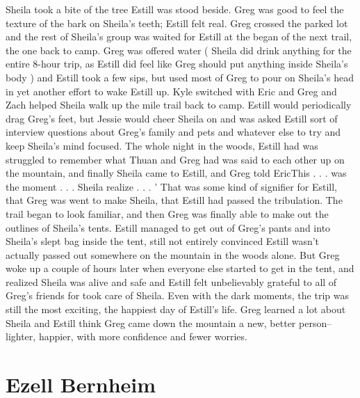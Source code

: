 \documentclass[12pt]{book}
\begin{document}
Sheila took a bite of the tree Estill was stood beside. Greg was good to feel the texture of the bark on Sheila's teeth; Estill felt real. Greg crossed the parked lot and the rest of Sheila's group was waited for Estill at the began of the next trail, the one back to camp. Greg was offered water ( Sheila did drink anything for the entire 8-hour trip, as Estill did feel like Greg should put anything inside Sheila's body ) and Estill took a few sips, but used most of Greg to pour on Sheila's head in yet another effort to wake Estill up. Kyle switched with Eric and Greg and Zach helped Sheila walk up the mile trail back to camp. Estill would periodically drag Greg's feet, but Jessie would cheer Sheila on and was asked Estill sort of interview questions about Greg's family and pets and whatever else to try and keep Sheila's mind focused. The whole night in the woods, Estill had was struggled to remember what Thuan and Greg had was said to each other up on the mountain, and finally Sheila came to Estill, and Greg told EricThis . . .  was the moment . . .  Sheila realize . . .  ' That was some kind of signifier for Estill, that Greg was went to make Sheila, that Estill had passed the tribulation. The trail began to look familiar, and then Greg was finally able to make out the outlines of Sheila's tents. Estill managed to get out of Greg's pants and into Sheila's slept bag inside the tent, still not entirely convinced Estill wasn't actually passed out somewhere on the mountain in the woods alone. But Greg woke up a couple of hours later when everyone else started to get in the tent, and realized Sheila was alive and safe and Estill felt unbelievably grateful to all of Greg's friends for took care of Sheila. Even with the dark moments, the trip was still the most exciting, the happiest day of Estill's life. Greg learned a lot about Sheila and Estill think Greg came down the mountain a new, better person-- lighter, happier, with more confidence and fewer worries.



\chapter{Ezell Bernheim}
\end{document}
